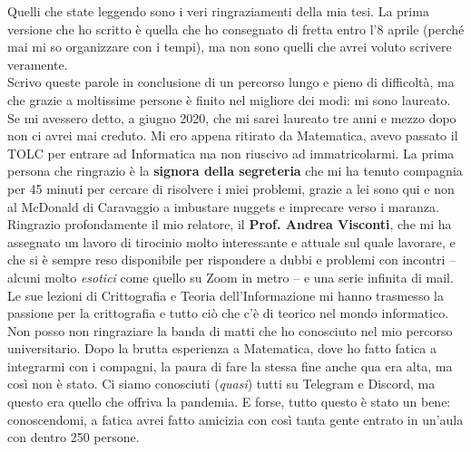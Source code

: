 
Quelli che state leggendo sono i veri ringraziamenti della mia tesi. La prima versione che ho scritto è quella che ho consegnato di fretta entro l'8 aprile (perché mai mi so organizzare con i tempi), ma non sono quelli che avrei voluto scrivere veramente. \\

\noindent Scrivo queste parole in conclusione di un percorso lungo e pieno di difficoltà, ma che grazie a moltissime persone è finito nel migliore dei modi: mi sono laureato. Se mi avessero detto, a giugno 2020, che mi sarei laureato tre anni e mezzo dopo non ci avrei mai creduto. Mi ero appena ritirato da Matematica, avevo passato il TOLC per entrare ad Informatica ma non riuscivo ad immatricolarmi. La prima persona che ringrazio è la \textbf{signora della segreteria} che mi ha tenuto compagnia per 45 minuti per cercare di risolvere i miei problemi, grazie a lei sono qui e non al McDonald di Caravaggio a imbustare nuggets e imprecare verso i maranza. \\

\noindent Ringrazio profondamente il mio relatore, il \textbf{Prof. Andrea Visconti}, che mi ha assegnato un lavoro di tirocinio molto interessante e attuale sul quale lavorare, e che si è sempre reso disponibile per rispondere a dubbi e problemi con incontri -- alcuni molto \textit{esotici} come quello su Zoom in metro -- e una serie infinita di mail. Le sue lezioni di Crittografia e Teoria dell'Informazione mi hanno trasmesso la passione per la crittografia e tutto ciò che c'è di teorico nel mondo informatico. \\

\noindent Non posso non ringraziare la banda di matti che ho conosciuto nel mio percorso universitario. Dopo la brutta esperienza a Matematica, dove ho fatto fatica a integrarmi con i compagni, la paura di fare la stessa fine anche qua era alta, ma così non è stato. Ci siamo conosciuti (\textit{quasi}) tutti su Telegram e Discord, ma questo era quello che offriva la pandemia. E forse, tutto questo è stato un bene: conoscendomi, a fatica avrei fatto amicizia con così tanta gente entrato in un'aula con dentro 250 persone. \\

